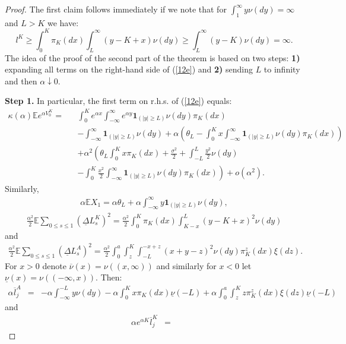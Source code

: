 \documentclass{aptpub}
\begin{document}
\begin{proof}
The first claim follows immediately if we note that for $\int_1^{\infty}y\nu(dy)=\infty$ and $L>K$ we have: $$l^K\geq \int_0^K\pi_K(dx)\int_L^{\infty}(y-K+x)\nu(dy)\geq\int_L^{\infty}(y-K)\nu(dy)=\infty.$$
The idea of the proof of the second part of the theorem
is based on two steps: {\bf 1)} expanding all terms
on the right-hand side of (\ref{12e}) and
{\bf 2)} sending $L$ to infinity and then $\alpha\downarrow 0$.

{\bf Step 1.} In particular, the first term on r.h.s. of (\ref{12e}) equals:
\begin{eqnarray*}
\kappa(\alpha)\mathbb{E}e^{\alpha V_0^K}=&&\int_0^Ke^{\alpha x}\int_{-\infty}^{\infty}e^{\alpha y}\mathbf{1}_{(|y|\geq L)}\nu(dy)\pi_K(dx)\\
&&-\int_{-\infty}^{\infty}\mathbf{1}_{(|y|\geq L)}\nu(dy)+\alpha\left(\theta_L-\int_0^Kx\int_{-\infty}^{\infty}\mathbf{1}_{(|y|\geq L)}\nu(dy)\pi_K(dx)\right)\\
&&+\alpha^2\left(\theta_L\int_0^Kx\pi_K(dx)+\frac{\sigma^2}{2}+\int_{-L}^{L}\frac{y^2}{2}\nu(dy)\right.\\
&&\left.-\int_0^K\frac{x^2}{2}\int_{-\infty}^{\infty}\mathbf{1}_{(|y|\geq L)}\nu(dy)\pi_K(dx)\right)+o(\alpha^2).
\end{eqnarray*}
Similarly,
\begin{eqnarray*}
\alpha\mathbb{E}X_1=\alpha\theta_L+\alpha\int_{-\infty}^{\infty}y\mathbf{1}_{(|y|\geq L)}\nu(dy),
\end{eqnarray*}
\begin{eqnarray*}
\frac{\alpha^2}{2}\mathbb{E}\sum_{0\leq s\leq 1}(\underline{\Delta}L_s^K)^2=\frac{\alpha^2}{2}\int_0^K\pi_K(dx)\int_{K-x}^{L}(y-K+x)^2\nu(dy)
\end{eqnarray*}
and
\begin{eqnarray*}
\frac{\alpha^2}{2}\mathbb{E}\sum_{0\leq s\leq 1}(\underline{\Delta}L_s^A)^2=\frac{\alpha^2}{2}\int_0^a\int_z^K\int_{-L}^{-x+z}(x+y-z)^2\nu(dy)\pi_K^z(dx)\xi(dz).
\end{eqnarray*}
For $x>0$ denote $\overline{\nu}(x)=\nu((x,\infty))$ and similarly for $x<0$ let $\underline{\nu}(x)=\nu((-\infty,x))$.
Then:
\begin{eqnarray*}
\alpha\overline{l}_j^A&=&
-\alpha\int_{-\infty}^{-L}y\nu(dy)-\alpha\int_0^Kx\pi_K(dx)\underline{\nu}(-L)+\alpha\int_0^a\int_z^Kz\pi_K^z(dx)\xi(dz)\underline{\nu}(-L)
\end{eqnarray*}
and
\begin{eqnarray*}
\alpha e^{\alpha K}\overline{l}_j^K&=&

\end{eqnarray*}
\end{proof}
\end{document}
